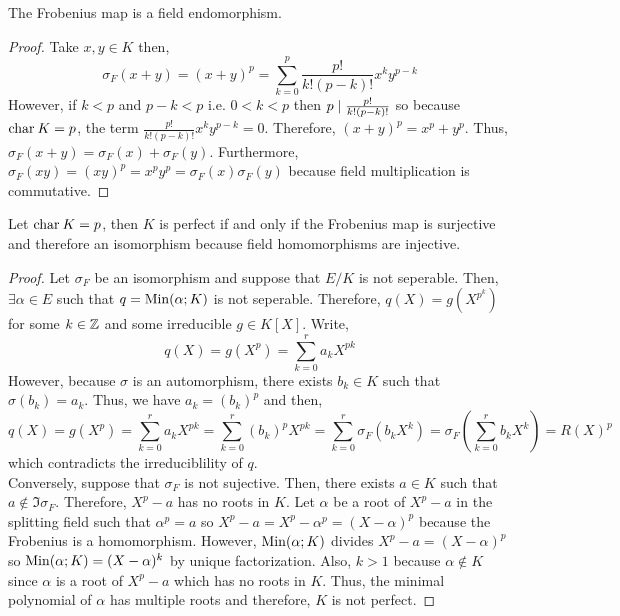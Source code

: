 \documentclass[12pt]{extarticle}
\begin{document}
\begin{lemma}
The Frobenius map is a field endomorphism. 
\end{lemma}

\begin{proof}
Take $x,y \in K$ then, 
\[\sigma_F(x + y) = (x + y)^p = \sum\limits_{k = 0}^p \frac{p!}{k! (p - k)!} x^k y^{p - k}\]
However, if $k < p$ and $p - k < p$ i.e. $0 < k < p$ then $p \mid \frac{p!}{k! (p - k)!}$ so because $\mathrm{char} \: K = p$, the term $\frac{p!}{k! (p - k)!} x^k y^{p - k} = 0$. Therefore, $(x + y)^p = x^p + y^p$. Thus, $\sigma_F(x + y) = \sigma_F(x) + \sigma_F(y)$. Furthermore, $\sigma_F(xy) = (xy)^p = x^p y^p = \sigma_F(x) \sigma_F(y)$ because field multiplication is commutative. 
\end{proof}

\begin{theorem}
Let $\mathrm{char} \: K = p$, then $K$ is perfect if and only if the Frobenius map is surjective and therefore an isomorphism because field homomorphisms are injective. 
\end{theorem}

\begin{proof}
Let $\sigma_F$ be an isomorphism and suppose that $E/K$ is not seperable. Then, $\exists \alpha \in E$ such that $q =\mathrm{Min}(\alpha;K)$ is not seperable. Therefore, $q(X) = g(X^{p^k})$ for some $k \in \mathbb{Z}$ and some irreducible $g \in K[X]$. Write, 
\[q(X) = g(X^p) = \sum_{k = 0}^r a_k X^{pk}\]
However, because $\sigma$ is an automorphism, there exists $b_k \in K$ such that $\sigma(b_k) = a_k$. Thus, we have $a_k = (b_k)^p$ and then,
\[q(X) = g(X^p) = \sum_{k = 0}^r a_k X^{pk} = \sum_{k = 0}^r (b_k)^p X^{pk} = \sum_{k = 0}^r \sigma_F(b_k X^k) = \sigma_F \left(\sum_{k = 0}^r b_k X^k\right) = R(X)^p \]
which contradicts the irreduciblility of $q$. \bigskip \\
Conversely, suppose that $\sigma_F$ is not sujective. Then, there exists $a \in K$ such that $a \notin \Im{\sigma_F}$. Therefore, $X^p - a$ has no roots in $K$. Let $\alpha$ be a root of $X^p - a$ in the splitting field such that $\alpha^p = a$ so $X^p - a = X^p - \alpha^p = (X - \alpha)^p$ because the Frobenius is a homomorphism. However, $\mathrm{Min}(\alpha;K)$ divides $X^p - a = (X - \alpha)^p$ so $\mathrm{Min}(\alpha;K) = (X - \alpha)^k$ by unique factorization. Also, $k > 1$ because $\alpha \notin K$ since $\alpha$ is a root of $X^p - a$ which has no roots in $K$. Thus, the minimal polynomial of $\alpha$ has multiple roots and therefore, $K$ is not perfect.   
\end{proof}
\end{document}
